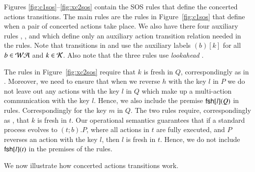 {Figures \ref{fig:c1sos}--\ref{fig:xc2sos} contain the SOS rules that define the concerted actions transitions. 
The main rules are the  rules in Figure~\ref{fig:c1sos} that define when a pair %
of concerted actions take place. 
We also have there four auxiliary rules , ,  and  which 
define only an auxiliary action transition relation needed in the  rules.
Note that transitions in  and  use the auxiliary labels $(b)[k]$ 
for all $b \in \mathcal{WA}$ and $k \in \mathcal{K}$. Also note that the three  rules use \emph{lookahead} \cite{Uli92}.



The rules  in Figure~\ref{fig:xc2sos} require that $k$ is fresh in $Q$,
correspondingly as in . Moreover, we need to ensure that when we reverse $h$ with the key $l$
in $P$ we do not leave out any actions with the key $l$ in $Q$ which make up a multi-action 
communication with the key $l$. Hence, we also include the premise $\mathsf{fsh}[l](Q)$ in  rules. Correspondingly for the key $m$ in $Q$.
The two rules  require, correspondingly as , that $k$ is fresh in $t$.
Our operational semantics guarantees that if a standard process evolves to $(t;b).P$, where all actions in $t$ are fully executed, and
$P$ reverses an action with the key $l$, then $l$ is fresh in $t$. Hence, we do not include $\mathsf{fsh}[l](t)$
in the premises of the  rules.

We now illustrate how concerted actions transitions work.

}
